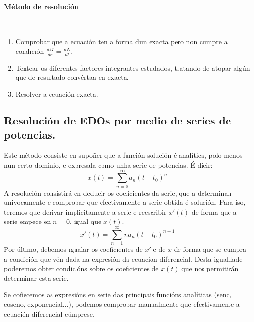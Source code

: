 \documentclass[11pt, a4paper,twoside]{article}
\theoremstyle{theorem-style}  %
\theoremstyle{definition-style}
\theoremstyle{example-style}
\begin{document}
\paragraph{Método de resolución} \ 
\begin{enumerate}
	\item Comprobar que a ecuación ten a forma dun exacta pero non cumpre a condición  $\frac{dM}{dx} = \frac{dN}{dt}$.
	\item Tentear os diferentes factores integrantes estudados, tratando de atopar algún que de resultado convértaa en exacta.
	\item Resolver a ecuación exacta.
\end{enumerate}

\subsection{Resolución de EDOs por medio de series de potencias.}
Este método consiste en supoñer que a función solución é analítica, polo menos nun certo dominio, e expresala como unha serie de potencias. É dicir:
\[ x(t)= \sum\limits_{n=0}^{\infty} a_n(t-t_0)^n \]
A resolución consistirá en deducir os coeficientes da serie, que a determinan univocamente e comprobar que efectivamente a serie obtida é solución.
Para iso, teremos que derivar implicitamente a serie e reescribir $ x'(t) $ de forma que a serie empece en $ n=0 $, igual que $ x(t) $. 
\[  x'(t)= \sum\limits_{n=1}^{\infty} na_n(t-t_0)^{n-1} \]
Por último, debemos igualar os coeficientes de $ x' $ e de $ x $ de forma que se cumpra a condición que vén dada na expresión da ecuación diferencial. Desta igualdade poderemos obter condicións sobre os coeficientes de $ x(t) $ que nos permitirán determinar esta serie. 

Se coñecemos as expresións en serie das principais funcións analíticas (seno, coseno, exponencial...), podemos comprobar manualmente que efectivamente a ecuación diferencial cúmprese.
\end{document}

